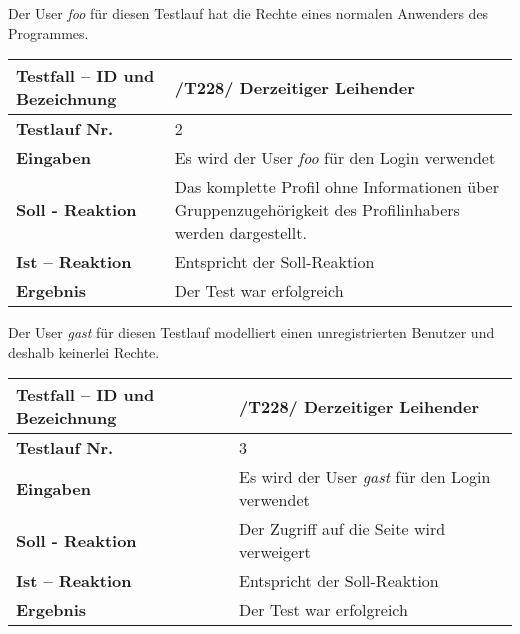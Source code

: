 Der User \emph{foo} für diesen Testlauf hat die Rechte eines normalen Anwenders
des Programmes. 

\begin{longtable}{|p{5cm}|p{10cm}|}
\hline
\textbf{Testfall -- ID und Bezeichnung} & \textnormal{/T228/ Derzeitiger
Leihender} \\
\hline
\textbf{Testlauf Nr.} & \textnormal{2} \\
\hline
\textbf{Eingaben} & \textnormal{Es wird der User \emph{foo} für den Login verwendet} \\
\hline
\textbf{Soll - Reaktion} & \textnormal{Das komplette Profil ohne Informationen über
Gruppenzugehörigkeit des Profilinhabers werden dargestellt.
} \\
\hline
\textbf{Ist -- Reaktion} & \textnormal{Entspricht der Soll-Reaktion} \\
\hline
\textbf{Ergebnis} & \textnormal{Der Test war erfolgreich} \\
\hline
 \end{longtable}

Der User \emph{gast} für diesen Testlauf modelliert einen unregistrierten
Benutzer und deshalb keinerlei Rechte. 

\begin{longtable}{|p{5cm}|p{10cm}|}
\hline
\textbf{Testfall -- ID und Bezeichnung} & \textnormal{/T228/ Derzeitiger
Leihender} \\
\hline
\textbf{Testlauf Nr.} & \textnormal{3} \\
\hline
\textbf{Eingaben} & \textnormal{Es wird der User \emph{gast} für den Login verwendet} \\
\hline
\textbf{Soll - Reaktion} & \textnormal{Der Zugriff auf die Seite wird verweigert
} \\
\hline
\textbf{Ist -- Reaktion} & \textnormal{Entspricht der Soll-Reaktion} \\
\hline
\textbf{Ergebnis} & \textnormal{Der Test war erfolgreich} \\
\hline
 \end{longtable}
